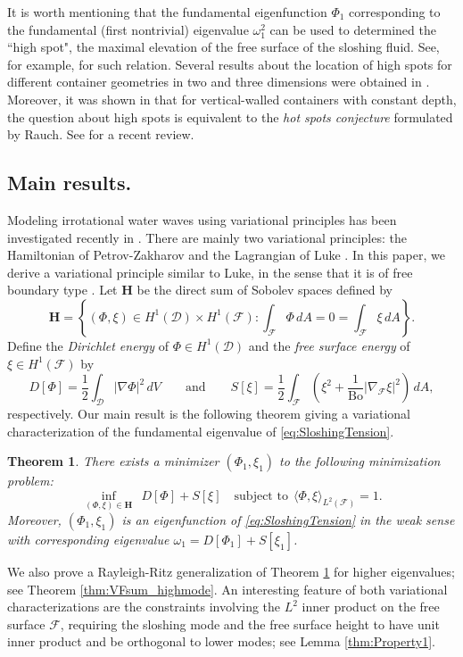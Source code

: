 \documentclass[letterpaper, 12pt]{amsart}
\newtheorem{theorem}[definition]{Theorem}
\newcommand{\bond}{\mathrm{Bo}}
\renewcommand{\H}{\mathbf{H}}
\newcommand{\D}{\mathcal{D}}
\newcommand{\F}{\mathcal{F}}
\begin{document}
It is worth mentioning that the fundamental eigenfunction $\Phi_1$ corresponding to the fundamental (first nontrivial) eigenvalue $\omega_1^2$ can be used to determined the ``high spot", the maximal elevation of the free surface of the sloshing fluid. See, for example, \cite{Lamb:1932aa} for such relation. Several results about the location of high spots for different container geometries in two and three dimensions were obtained in \cite{Kulczycki:2009aa, Kulczycki:2011aa, Kulczycki:2012aa}. Moreover, it was shown in \cite{Kulczycki:2009aa} that for vertical-walled containers with constant depth, the question about high spots is equivalent to the \emph{hot spots conjecture} formulated by Rauch. See \cite{Burdzy:2013aa} for a recent review.  


\subsection{Main results.}
Modeling irrotational water waves using variational principles has been investigated recently in \cite{Clamond:2012aa}. There are mainly two variational principles: the Hamiltonian of Petrov-Zakharov \cite{Petrov:1964aa, Zakharov:1968aa} and the Lagrangian of Luke \cite{Whitham:1965aa, Luke:1967aa, Whitham:1967aa}. In this paper, we derive a variational principle similar to Luke, in the sense that it is of free boundary type \cite[pp 208]{Courant:1953aa}.  Let $\H$ be the direct sum of Sobolev spaces defined by
\[ \H = \left\{ (\Phi,\xi)\in H^1(\D)\times H^1(\F)\colon \int_\F\Phi\, dA = 0 = \int_\F\xi\, dA\right\}. \]
Define the \emph{Dirichlet energy} of $\Phi\in H^1(\D)$ and the \emph{free surface energy} of $\xi\in H^1(\F)$ by
\[ D[\Phi] = \frac{1}{2}\int_\D |\nabla\Phi|^2\, dV \qquad\text{and}\qquad  S[\xi] = \frac{1}{2}\int_\F\left(\xi^2 + \frac{1}{\bond}|\nabla_\F\xi|^2\right)\, dA, \]
respectively. Our main result is the following theorem giving a variational characterization of the fundamental   eigenvalue of \eqref{eq:SloshingTension}. 
\begin{theorem} \label{thm:VFsum_firstmode}
There exists a minimizer $(\Phi_1,\xi_1)$ to the following minimization problem: 
\begin{equation}\label{eq:VFsum_firstmode}
\inf_{(\Phi,\xi)\in\H} \ \   D[\Phi] + S[\xi]  \quad
\textrm{subject to} \ \  \langle \Phi,\xi \rangle_{L^2(\F)} =1 .
\end{equation}
Moreover, $(\Phi_1,\xi_1)$ is an eigenfunction of \eqref{eq:SloshingTension} in the weak sense with corresponding eigenvalue $\omega_1 = D[\Phi_1] + S[\xi_1]$.
\end{theorem}
We also prove a Rayleigh-Ritz generalization of Theorem \ref{thm:VFsum_firstmode} for higher eigenvalues; see Theorem \ref{thm:VFsum_highmode}. An interesting feature of both variational characterizations are the constraints involving the $L^2$ inner product on the free surface $\F$, requiring the sloshing mode and the free surface height to have unit inner product and be orthogonal to lower modes; see Lemma \ref{thm:Property1}. 
\end{document}
